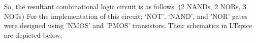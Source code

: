\documentclass[a4paper,11pt]{article}%
\begin{document}
So, the resultant combinational logic circuit is as follows. (2 NANDs, 2 NORs, 3 NOTs) For the implementation of this circuit; ‘NOT’, ‘NAND’, and 'NOR' gates were designed using 'NMOS' and 'PMOS' transistors. Their schematics in LTspice are depicted below.

\begin{figure}[H]
	\centering
	\hfill
	\hfill
\end{figure}
\end{document}
